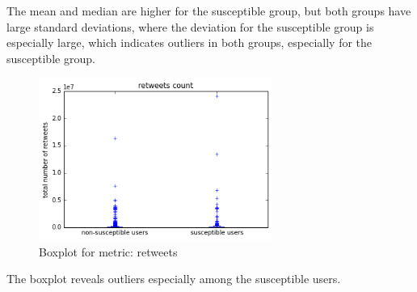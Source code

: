 \documentclass[10pt]{IEEEtran}
\begin{document}
The mean and median are higher for the susceptible group, but both groups have large standard deviations, where the deviation for the susceptible group is especially large, which indicates outliers in both groups, especially for the susceptible group.
\begin{figure}[H]
  \centering
  \includegraphics[width=3.0in]{retweets_boxplot}
  \caption{Boxplot for metric: retweets}
  \label{fig:retweets_boxplot}
\end{figure}
The boxplot reveals outliers especially among the susceptible users.
\\\\
\end{document}
